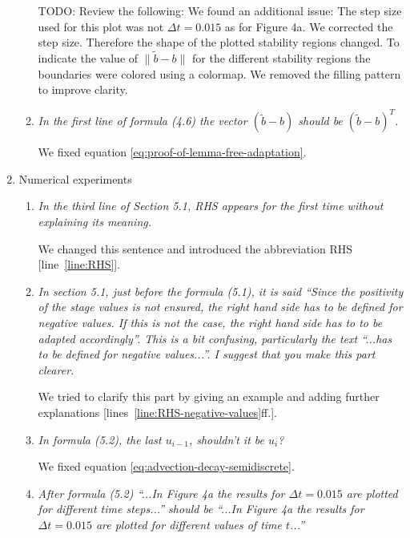 \documentclass[11pt]{letter}
\newcommand{\revA}[1]{{\color{red}#1}}
\begin{document}
\begin{letter}{}
\begin{enumerate}[label=\arabic*.]
\begin{enumerate}[label=\alph*)]
    \revA{TODO: Review the following:} %
    We found an additional issue: The step size used for this plot was not $\Delta t = 0.015$ as for Figure 4a. We corrected the step size. Therefore the shape of the plotted stability regions changed. 
	To indicate the value of $\| \tilde b - b \|$ for the different stability regions the boundaries were colored using a colormap.  
	We removed the filling pattern to improve clarity.
    


    \item \emph{%
    In the first line of formula (4.6) the vector $(\tilde b - b)$ should be
     $(\tilde b - b)^T$.
    }

    We fixed equation \eqref{eq:proof-of-lemma-free-adaptation}.
  \end{enumerate}


  \item Numerical experiments
  \begin{enumerate}[label=\alph*)]
    \item \emph{%
    In the third line of Section 5.1, RHS appears for the first time without
    explaining its meaning.
    }

    We changed this sentence and introduced the abbreviation RHS
    [line~\ref{line:RHS}].


    \item \emph{%
    In section 5.1, just before the formula (5.1), it is said ``Since the
    positivity of the stage values is not ensured, the right hand side has to be
    defined for negative values. If this is not the case, the right hand side
    has to to be adapted accordingly''. This is a bit confusing, particularly
    the text ``...has to be defined for negative values...''. I suggest that
    you make this part clearer.
    }

    We tried to clarify this part by giving an example and adding further
    explanations [lines~\ref{line:RHS-negative-values}ff.].


    \item \emph{%
    In formula (5.2), the last $u_{i-1}$, shouldn’t it be $u_i$?
    }

    We fixed equation \eqref{eq:advection-decay-semidiscrete}.


    \item \emph{%
    After formula (5.2) ``...In Figure 4a the results for $\Delta t = 0.015$
    are plotted for different time steps...'' should be ``...In Figure 4a the
    results for $\Delta t = 0.015$ are plotted for different values of time $t$...''
    }


\end{enumerate}
\end{enumerate}
\end{letter}
\end{document}
